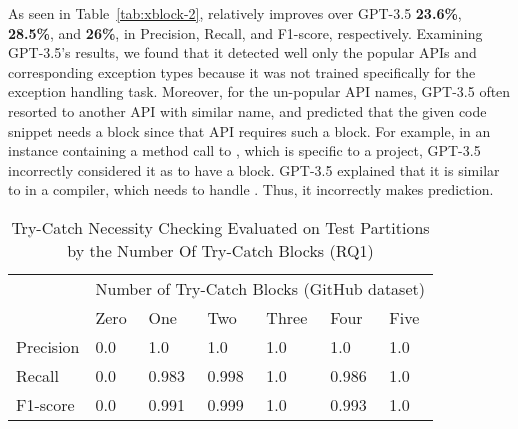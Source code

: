 As seen in Table~\ref{tab:xblock-2}, {\tool} relatively improves over
GPT-3.5 {\bf 23.6\%}, {\bf 28.5\%}, and {\bf 26\%}, in
Precision, Recall, and F1-score, respectively.
Examining GPT-3.5's results, we found that it detected well only the
popular APIs and corresponding exception types because it was not
trained specifically for the exception handling task. Moreover, for
the un-popular API names, GPT-3.5 often resorted to another API with
similar name, and predicted that the given code snippet needs a
 block since that API requires such a block. For
example, in an instance containing a method call to
, which is specific to a project,
GPT-3.5 incorrectly considered it as to have a 
block. GPT-3.5 explained that it is similar to  in a
compiler, which needs to handle
. Thus, it incorrectly makes
prediction.




\begin{table}[t]%
  \caption{Try-Catch Necessity Checking Evaluated on Test Partitions by the Number Of Try-Catch Blocks (RQ1) }
  \vspace{-12pt}
  \small
	\begin{center}
		\renewcommand{\arraystretch}{1}
		\begin{tabular}{| p{1.0cm}<{\centering} | p{0.7cm}<{\centering} | p{0.7cm}<{\centering}| p{0.7cm}<{\centering} | p{0.7cm}<{\centering} | p{0.7cm}<{\centering} | p{0.7cm}<{\centering} | }
		  \hline
			\multirow{2}{*}{} & \multicolumn{6}{c|}{Number of Try-Catch Blocks (GitHub dataset)} \\
			\cline{2-7}
			  & Zero  & One & Two & Three & Four & Five\\
			\hline
			Precision & 0.0 &  1.0 & 1.0 & 1.0 & 1.0 & 1.0\\
			\hline
			Recall   & 0.0 &  0.983 & 0.998 & 1.0 & 0.986 & 1.0\\
			\hline
			F1-score   & 0.0  &  0.991 & 0.999 & 1.0 & 0.993 & 1.0\\
			\hline
		\end{tabular}
		\label{tab:rq1-detailed-result}
	\end{center}
\end{table}

